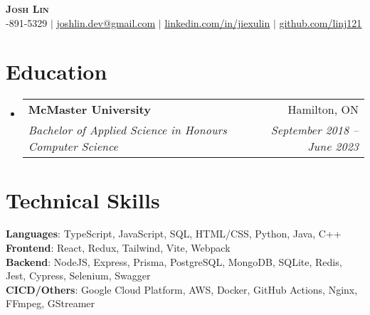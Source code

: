 \documentclass[letterpaper,11pt]{article}
\makeatletter
\newcommand{\resumeSubheading}[4]{
  \vspace{-2pt}\item
    \begin{tabular*}{0.97\textwidth}[t]{l@{\extracolsep{\fill}}r}
      \textbf{#1} & #2 \\
      \textit{\small#3} & \textit{\small #4} \\
    \end{tabular*}\vspace{-7pt}
}
\newcommand{\resumeSubHeadingListStart}{\begin{itemize}[leftmargin=0.15in, label={}]}
\newcommand{\resumeSubHeadingListEnd}{\end{itemize}}
\makeatother
\begin{document}

\begin{center}
    \textbf{\Huge \scshape Josh Lin} \\ \vspace{7pt}
    \small \faPhone \thinspace {}-891-5329
    $|$ \faEnvelope \thinspace \thinspace \href{mailto:joshlin.dev@gmail.com}{\underline{joshlin.dev@gmail.com}}
    $|$ \faLinkedin \thinspace \thinspace \href{https://linkedin.com/in/jiexulin}{\underline{linkedin.com/in/jiexulin}}
    $|$ \faGithub \thinspace \thinspace \href{https://github.com/linj121}{\underline{github.com/linj121}}
\end{center}


\section{Education}
  \resumeSubHeadingListStart
    \resumeSubheading
      {McMaster University}{Hamilton, ON}
      {Bachelor of Applied Science in Honours Computer Science}{September 2018 -- June 2023}
  \resumeSubHeadingListEnd

%

\section{Technical Skills}
 \begin{itemize}[leftmargin=0.15in, label={}]
    \small{\item{
      \textbf{Languages}{: TypeScript, JavaScript, SQL, HTML/CSS, Python, Java, C++} \\
      \textbf{Frontend}{: React, Redux, Tailwind, Vite, Webpack } \\
      \textbf{Backend}{: NodeJS, Express, Prisma, PostgreSQL, MongoDB, SQLite, Redis, Jest, Cypress, Selenium, Swagger } \\
      \textbf{CICD/Others}{: Google Cloud Platform, AWS, Docker, GitHub Actions, Nginx, FFmpeg, GStreamer } \\
     }}
 \end{itemize}
\end{document}
